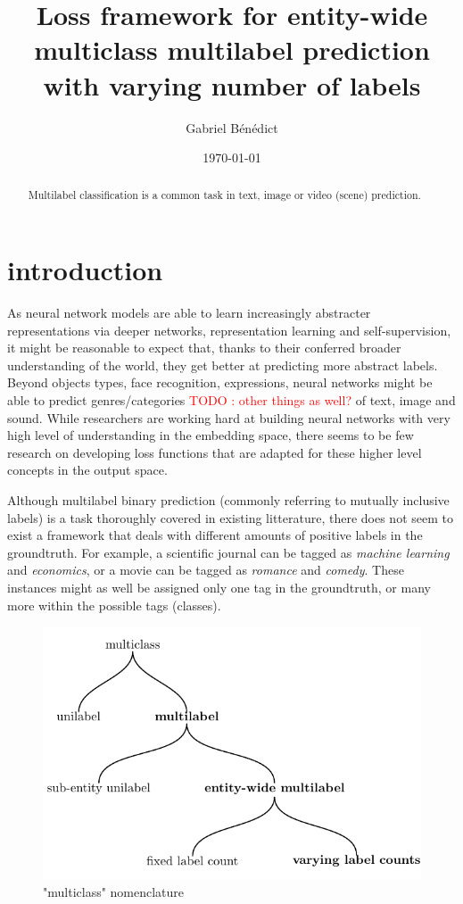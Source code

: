 \documentclass[sigconf,natbib,screen=true,review=true,anonymous]{acmart}
\author{Gabriel Bénédict}
\date{\today}
\title{}
\newcommand\todo[1]{\textcolor{red}{TODO : #1}}
\begin{document}
\title{Loss framework for entity-wide multiclass multilabel prediction with varying number of labels}


\begin{abstract}
Multilabel classification is a common task in text, image or video (scene) prediction.
\end{abstract}



\maketitle

\acresetall

\section{introduction}
\label{sec:orgf5776a7}

As neural network models are able to learn increasingly abstracter representations via deeper networks, representation learning and self-supervision, it might be reasonable to expect that, thanks to their conferred broader understanding of the world, they get better at predicting more abstract labels. Beyond objects types, face recognition, expressions, neural networks might be able to predict genres/categories \todo{other things as well?} of text, image and sound. While researchers are working hard at building neural networks with very high level of understanding in the embedding space, there seems to be few research on developing loss functions that are adapted for these higher level concepts in the output space.

Although multilabel binary prediction (commonly referring to mutually inclusive labels) is a task thoroughly covered in existing litterature, there does not seem to exist a framework that deals with different amounts of positive labels in the groundtruth. For example, a scientific journal can be tagged as \emph{machine learning} and \emph{economics}, or a movie can be tagged as \emph{romance} and \emph{comedy}. These instances might as well be assigned only one tag in the groundtruth, or many more within the possible tags (classes).

\begin{figure}[htbp]
\centering
\includegraphics[width=.9\linewidth]{./tree/Tree.pdf}
\caption{\label{fig:tree}
"multiclass" nomenclature}
\end{figure}
\end{document}
